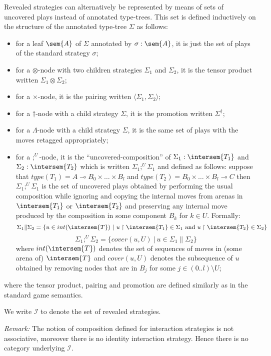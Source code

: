 Revealed strategies can alternatively be represented by means of
sets of uncovered plays instead of annotated type-trees. This set is
defined inductively on the structure of the annotated type-tree
$\Sigma$ as follows:
\begin{itemize}
\item for a leaf $\sem{A}$ of $\Sigma$ annotated by $\sigma :\sem{A}$, it is just the set of plays of the standard strategy $\sigma$;
\item for a $\otimes$-node with two children strategies $\Sigma_1$ and $\Sigma_2$, it is the tensor product written $\Sigma_1 \otimes \Sigma_2$;
\item for a $\times$-node, it is the pairing written $\langle \Sigma_1, \Sigma_2 \rangle$;
\item for a $\dagger$-node with a child strategy $\Sigma$, it is the promotion written $\Sigma^\dagger$;
\item for a $\Lambda$-node with a child strategy $\Sigma$, it is the same set of plays with the moves retagged appropriately;

\item for a $;^U$-node, it is the ``uncovered-composition'' of $\Sigma_1 : \intersem{T_1}$ and $\Sigma_2 :\intersem{T_2}$ which is written $\Sigma_1
;^U \Sigma_1$ and defined as follows: suppose that $type(T_1) = A
\multimap B_0 \times \ldots \times B_l$ and $type(T_2) = B_0 \times
\ldots \times B_l \multimap C$ then $\Sigma_1 ;^U \Sigma_1$ is the
set of uncovered plays obtained by performing the usual composition
while ignoring and copying the internal moves from arenas in
$\intersem{T_1}$ or $\intersem{T_2}$ and preserving any internal
move produced by the composition in some component $B_k$ for $k \in
U$. Formally:
$$ \Sigma_1 \| \Sigma_2 = \{ u \in int(\intersem{T}) \ | \ u \upharpoonright \intersem{T_1} \in \Sigma_1 \mbox{ and } u \upharpoonright \intersem{T_2} \in \Sigma_2 \}$$
$$ \Sigma_1 ;^U \Sigma_2 = \{ cover(u,U) \ | \ u \in \Sigma_1 \| \Sigma_2 \}$$
where $int(\intersem{T})$ denotes the set of sequences of moves in (some arena of) $\intersem{T}$
and $cover(u,U)$ denotes the subsequence of $u$ obtained by removing nodes that are in $B_j$ for some $j \in ( 0..l ) \setminus U$;
\end{itemize}
where the tensor product, pairing and promotion are defined similarly as in the standard game semantics.

We write $\mathcal{I}$ to denote the set of revealed strategies.

\emph{Remark:} The notion of composition defined for interaction strategies is not associative, moreover there is no identity
interaction strategy. Hence there is no category underlying $\mathcal{I}$.



